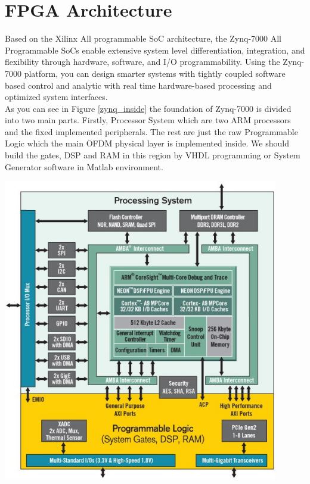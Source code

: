 \section{FPGA Architecture}
\label{fpga_arch}
Based on the Xilinx All programmable SoC architecture, the Zynq-7000 All Programmable SoCs enable extensive system level differentiation, integration, and flexibility through hardware, software, and I/O programmability. Using the Zynq-7000 platform, you can design smarter systems with tightly coupled software based control and analytic with real time hardware-based processing and optimized system interfaces.\\
As you can see in Figure \ref{zynq_inside} the foundation of Zynq-7000 is divided into two main parts. Firstly, Processor System which are two ARM processors and the fixed implemented peripherals. The rest are just the raw Programmable Logic which the main OFDM physical layer is implemented inside. We should build the gates, DSP and RAM in this region by VHDL programming or System Generator software in Matlab environment.\\


\begin{center}
\includegraphics[width=12cm]{content/fig/zynq_inside.JPG}
\label{zynq_inside}
\end{center}

